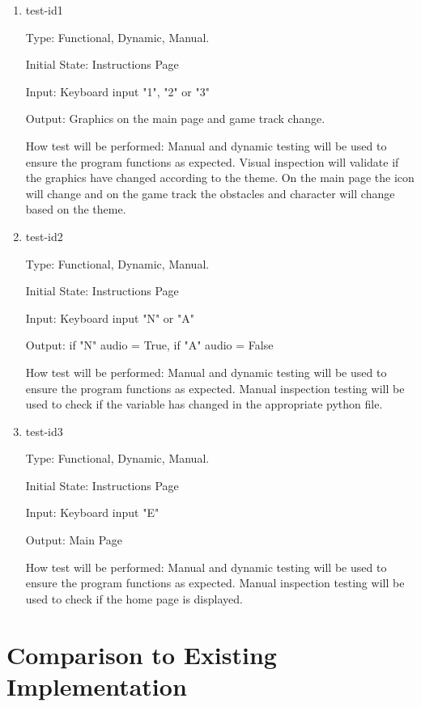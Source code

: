 \documentclass[12pt, titlepage]{article}
\begin{document}
\begin{enumerate}
	
	\item{test-id1\\}
	
	Type: Functional, Dynamic, Manual. 
	
	Initial State: Instructions Page
	
	Input: Keyboard input "1", "2" or "3" 
	
	Output: Graphics on the main page and game track change. 
	
	How test will be performed: Manual and dynamic testing will be used to ensure the program functions as expected. Visual inspection will validate if the graphics have changed according to the theme. On the main page the icon will change and on the game track the obstacles and character will change based on the theme. 
	
	\item{test-id2\\}
	
	Type: Functional, Dynamic, Manual.
	
	Initial State: Instructions Page
	
	Input: Keyboard input "N" or "A" 
	
	Output: if "N" audio = True, if "A" audio = False
	
	How test will be performed: Manual and dynamic testing will be used to ensure the program functions as expected. Manual inspection testing will be used to check if the variable has changed in the appropriate python file. 
	
	\item{test-id3\\}
	
	Type: Functional, Dynamic, Manual.
	
	Initial State: Instructions Page
	
	Input: Keyboard input "E"
	
	Output: Main Page
	
	How test will be performed: Manual and dynamic testing will be used to ensure the program functions as expected. Manual inspection testing will be used to check if the home page is displayed. 
	
\end{enumerate}

	
\section{Comparison to Existing Implementation}	
				
\end{document}
